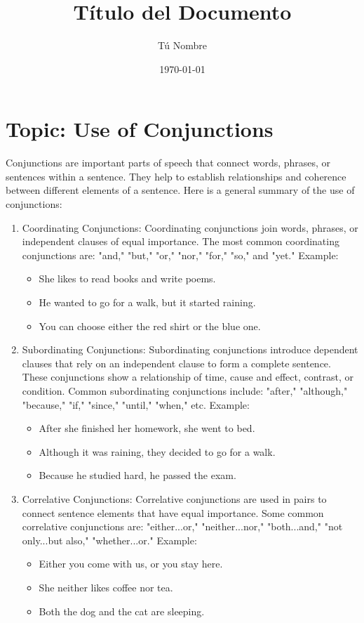 \documentclass{article}
\title{Título del Documento}
\author{Tú Nombre}
\date{\today}
\begin{document}

\section*{Topic: Use of Conjunctions}
Conjunctions are important parts of speech that connect words, phrases, or sentences within a sentence. They help to establish relationships and coherence between different elements of a sentence. Here is a general summary of the use of conjunctions:

\begin{enumerate}
    \item Coordinating Conjunctions:
    Coordinating conjunctions join words, phrases, or independent clauses of equal importance. The most common coordinating conjunctions are: "and," "but," "or," "nor," "for," "so," and "yet."
    Example:
    \begin{itemize}
        \item She likes to read books and write poems.
        \item He wanted to go for a walk, but it started raining.
        \item You can choose either the red shirt or the blue one.
    \end{itemize}
    \item Subordinating Conjunctions:
    Subordinating conjunctions introduce dependent clauses that rely on an independent clause to form a complete sentence. These conjunctions show a relationship of time, cause and effect, contrast, or condition. Common subordinating conjunctions include: "after," "although," "because," "if," "since," "until," "when," etc.
    Example:
    \begin{itemize}
        \item After she finished her homework, she went to bed.
        \item Although it was raining, they decided to go for a walk.
        \item Because he studied hard, he passed the exam.
    \end{itemize}
    \item Correlative Conjunctions:
    Correlative conjunctions are used in pairs to connect sentence elements that have equal importance. Some common correlative conjunctions are: "either...or," "neither...nor," "both...and," "not only...but also," "whether...or."
    Example:
    \begin{itemize}
        \item Either you come with us, or you stay here.
        \item She neither likes coffee nor tea.
        \item Both the dog and the cat are sleeping.
    \end{itemize}
\end{enumerate}
\end{document}
